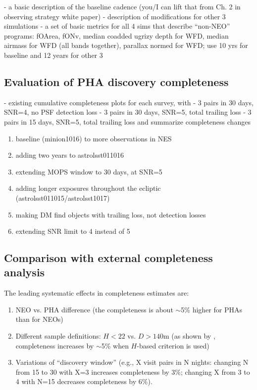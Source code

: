 - a basic description of the baseline cadence (you/I can lift that from 
  Ch. 2 in observing strategy white paper) 
- description of modifications for other 3 simulations 
- a set of basic metrics for all 4 sims that describe “non-NEO” programs: 
   fOArea, fONv, median coadded ugrizy depth for WFD, median airmass 
   for WFD (all bands together), parallax normed for WFD; use 10 yrs
   for baseline and 12 years for other 3 
   
 \subsection{Evaluation of PHA discovery completeness}
 
- existing cumulative completeness plots for each survey, with
       - 3 pairs in 30 days, SNR=4, no PSF detection loss
       - 3 pairs in 30 days, SNR=5, total trailing loss
       - 3 pairs in 15 days, SNR=5, total trailing loss
and summarize completeness changes 
\begin{enumerate}
\item baseline (minion1016) to more observations in NES
\item adding two years to astrolsst011016
\item extending MOPS window to 30 days, at SNR=5
\item adding longer exposures throughout the ecliptic (astrolsst011015/astrolsst1017)
\item making DM find objects with trailing loss, not detection losses
\item extending SNR limit to 4 instead of 5
\end{enumerate}

\subsection{Comparison with external completeness analysis}

The leading systematic effects in completeness estimates are: 
\begin{enumerate}
\item NEO vs. PHA difference (the completeness is about $\sim$5\% higher for PHAs than for NEOs) 
\item Different sample definitions: $H<22$ vs. $D>140$m (as shown by \citep{GMS2016}, completeness
           increases by $\sim$5\% when $H$-based criterion is used) 
\item Variations of ``discovery window'' (e.g., X visit pairs in N nights: changing N from 15 to 30 with X=3 increases
          completeness by 3\%; changing X from 3 to 4 with N=15 decreases completeness by 6\%). 
\end{enumerate}          
          

